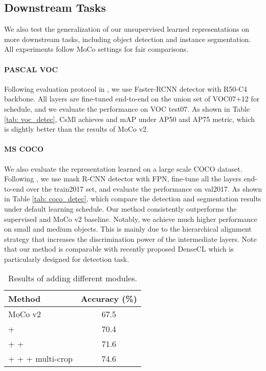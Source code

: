\documentclass[10pt,twocolumn,letterpaper]{article}
\begin{document}
\subsection{Downstream Tasks}
We also test the generalization of our unsupervised learned representations on more downstream tasks, including object detection and instance segmentation. All experiments follow MoCo \cite{he2020momentum} settings for fair comparisons.

\vspace{-0.1in}
\paragraph{PASCAL VOC}
Following evaluation protocol in \cite{he2020momentum}, we use Faster-RCNN \cite{ren2015faster} detector with R50-C4 backbone. All layers are fine-tuned end-to-end on the union set of VOC07+12 for  schedule, and we evaluate the performance on VOC test07. As shown in Table \ref{tab: voc_detec}, CsMl achieves  and  mAP under AP50 and AP75 metric, which is slightly better than the results of MoCo v2.


\vspace{-0.15in}
\paragraph{MS COCO} We also evaluate the representation learned on a large scale COCO dataset. Following \cite{he2020momentum}, we use mask R-CNN \cite{he2017mask} detector with FPN, fine-tune all the layers end-to-end over the train2017 set, and evaluate the performance on val2017.  As shown in Table \ref{tab: coco_detec}, which compare the detection and segmentation results under default  learning schedule. Our method consistently outperforms the supervised and MoCo v2 baseline.
Notably, we achieve much higher performance on small and medium objects. This is mainly due to the hierarchical alignment strategy that increases the discrimination power of the intermediate layers. Note that our method is comparable with recently proposed DenseCL \cite{wang2020dense}  which is particularly designed for detection task. 


\begin{table}[]
\centering
\caption{Results of adding different modules.}

\vspace{0.05in}
\begin{tabular}{lc}
\toprule
Method                                  & Accuracy (\%)  \\
\midrule
MoCo v2                                 & 67.5         \\
 +                      & 70.4        \\
 +  +                    & 71.6        \\
 +  +  + multi-crop      & 74.6        \\
\bottomrule
\end{tabular}
\label{tab: diff_modules}
\end{table}
\end{document}
